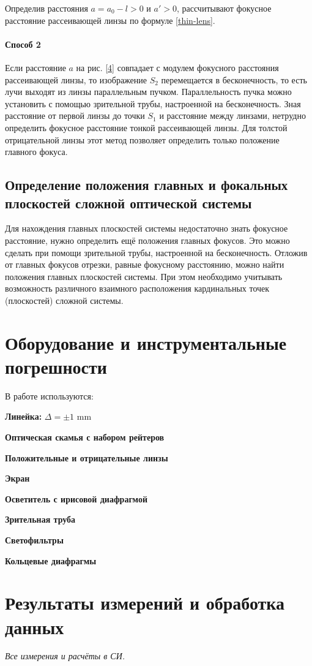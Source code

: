 \documentclass[a4paper]{article}
\newcommand{\picref}[1]{рис. \ref{#1}}
\newcommand{\Equip}[3]{
	
	{\bf #1:} $\Delta = \pm #2$ \si{#3}}
\newcommand{\equip}[1]{
	
	{\bf #1}}
\begin{document}
Определив расстояния $ a = a_0 - l > 0$ и $ a'>0 $, рассчитывают фокусное расстояние рассеивающей линзы по формуле \eqref{thin-lens}.

\paragraph{Способ 2}

Если расстояние $ a $ на \picref{4} совпадает с модулем фокусного расстояния рассеивающей линзы, то изображение $S_2$ перемещается в бесконечность, то есть лучи выходят из линзы параллельным пучком. Параллельность пучка можно установить с помощью зрительной трубы, настроенной на бесконечность. Зная расстояние от первой линзы до точки $S_1$ и расстояние между линзами, нетрудно определить фокусное расстояние тонкой рассеивающей линзы. Для толстой отрицательной линзы этот метод позволяет определить только положение главного фокуса.


\subsection{Определение положения главных и фокальных плоскостей сложной оптической системы}

Для нахождения главных плоскостей системы недостаточно знать фокусное расстояние, нужно определить ещё положения главных фокусов. Это можно сделать при помощи зрительной трубы, настроенной на бесконечность. Отложив от главных фокусов отрезки, равные фокусному расстоянию, можно найти положения главных плоскостей системы. При этом необходимо учитывать возможность различного взаимного расположения кардинальных точек (плоскостей) сложной системы.


\section{Оборудование и инструментальные погрешности}

В работе используются:

\Equip{Линейка}{1}{\milli \metre}
\equip{Оптическая скамья с набором рейтеров}
\equip{Положительные и отрицательные линзы}
\equip{Экран}
\equip{Осветитель с ирисовой диафрагмой}
\equip{Зрительная труба}
\equip{Светофильтры}
\equip{Кольцевые диафрагмы}



\section{Результаты измерений и обработка данных}
\emph{Все измерения и расчёты в СИ.}
\end{document}
